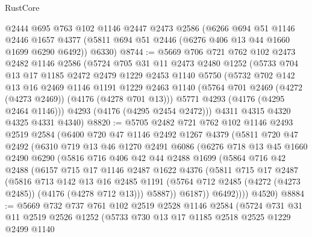 \begin{lexlean}{RustCore}
\begin{coremodule}
    @2444
    @695
    @763
    @102
    @1146
    @2447
    @2473
    @2586
    (@6266
      @694
      @51
      @1146
      @2446
      @1657
      @4377
      (@5811 @694 @51 @2446 (@6276 @406 @13 @44 @1660 @1699 @6290 @6492))
      @6330)
@8744 := @5669
    @706
    @721
    @762
    @102
    @2473
    @2482
    @1146
    @2586
    (@5724
      @705
      @31
      @11
      @2473
      @2480
      @1252
      (@5733
        @704
        @13
        @17
        @1185
        @2472
        @2479
        @1229
        @2453
        @1140
        @5750
        (@5732
          @702
          @142
          @13
          @16
          @2469
          @1146
          @1191
          @1229
          @2463
          @1140
          (@5764 @701 @2469 (@4272 (@4273 @2469)) (@4176 (@4278 @701 @13)))
          @5771
          @4293
          (@4176 (@4295 @2464 @1146)))
        @4293
        (@4176 (@4295 @2454 @2472)))
      @4311
      @4315
      @4320
      @4325
      @4331
      @4340)
@8820 := @5705
    @2482
    @721
    @762
    @102
    @1146
    @2493
    @2519
    @2584
    (@6400
      @720
      @47
      @1146
      @2492
      @1267
      @4379
      (@5811
        @720
        @47
        @2492
        (@6310
          @719
          @13
          @46
          @1270
          @2491
          @6086
          (@6276
            @718
            @13
            @45
            @1660
            @2490
            @6290
            (@5816
              @716
              @406
              @42
              @44
              @2488
              @1699
              (@5864
                @716
                @42
                @2488
                (@6157
                  @715
                  @17
                  @1146
                  @2487
                  @1622
                  @4376
                  (@5811
                    @715
                    @17
                    @2487
                    (@5816
                      @713
                      @142
                      @13
                      @16
                      @2485
                      @1191
                      (@5764 @712 @2485 (@4272 (@4273 @2485)) (@4176 (@4278 @712 @13)))
                      @5887))
                  @6187))
              @6492))))
      @4520)
@8884 := @5669
    @732
    @737
    @761
    @102
    @2519
    @2528
    @1146
    @2584
    (@5724
      @731
      @31
      @11
      @2519
      @2526
      @1252
      (@5733
        @730
        @13
        @17
        @1185
        @2518
        @2525
        @1229
        @2499
        @1140

\end{coremodule}
\end{lexlean}
